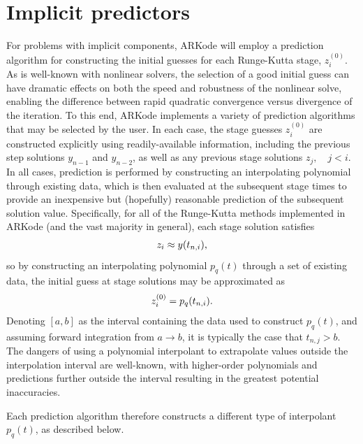 \documentclass[letterpaper,10pt,english]{sphinxmanual}
\begin{document}
\section{Implicit predictors}
\label{Mathematics:implicit-predictors}\label{Mathematics:mathematics-predictors}
For problems with implicit components, ARKode will employ a prediction
algorithm for constructing the initial guesses for each Runge-Kutta
stage, \(z_i^{(0)}\).  As is well-known with nonlinear solvers,
the selection of a good initial guess can have dramatic effects on both
the speed and robustness of the nonlinear solve, enabling the
difference between rapid quadratic convergence versus divergence of
the iteration.  To this end, ARKode implements a variety of prediction
algorithms that may be selected by the user.  In each case, the stage
guesses \(z_i^{(0)}\) are constructed explicitly using
readily-available information, including the previous step solutions
\(y_{n-1}\) and \(y_{n-2}\), as well as any previous stage
solutions \(z_j, \quad j<i\).  In all cases, prediction is
performed by constructing an interpolating polynomial through
existing data, which is then evaluated at the subsequent stage times
to provide an inexpensive but (hopefully) reasonable prediction of the
subsequent solution value.  Specifically, for all of the Runge-Kutta
methods implemented in ARKode (and the vast majority in general), each
stage solution satisfies
\begin{gather}
\begin{split}z_i \approx y(t_{n,i}),\end{split}\notag
\end{gather}
so by constructing an interpolating polynomial \(p_q(t)\) through
a set of existing data, the initial guess at stage solutions may be
approximated as
\begin{gather}
\begin{split}z_i^{(0)} = p_q(t_{n,i}).\end{split}\notag
\end{gather}
Denoting \([a,b]\) as the interval containing the data used to
construct \(p_q(t)\), and assuming forward integration from
\(a\to b\), it is typically the case that \(t_{n,j} > b\).
The dangers of using a polynomial interpolant to extrapolate values
outside the interpolation interval are well-known, with higher-order
polynomials and predictions further outside the interval resulting in
the greatest potential inaccuracies.

Each prediction algorithm therefore constructs a different type of
interpolant \(p_q(t)\), as described below.
\end{document}
